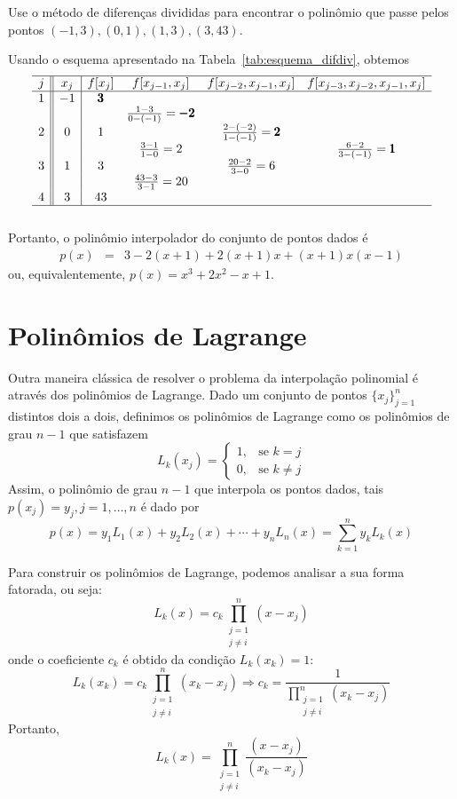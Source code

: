 \begin{ex}
Use o método de diferenças divididas para encontrar o polinômio que passe pelos pontos $(-1,3),(0,1),(1,3),(3,43)$.
\end{ex}
\begin{sol}
Usando o esquema apresentado na Tabela~\ref{tab:esquema_difdiv}, obtemos
\begin{equation*}
\begin{array}{c||c|cccc}\hline
 j&x_j&f[x_j]&f[x_{j-1},x_j]&f[x_{j-2},x_{j-1},x_j]&f[x_{j-3},x_{j-2},x_{j-1},x_j]\\\hline
1& -1 & \pmb{3}&&&\\
&&&\frac{1-3}{0-(-1)}=\pmb{-2}&&\\
2&0&1&&\frac{2-(-2)}{1-(-1)}=\pmb{2}&\\
&&&\frac{3-1}{1-0}=2&&\frac{6-2}{3-(-1)}=\pmb{1}\\
3&1&3&&\frac{20-2}{3-0}=6&\\
&&&\frac{43-3}{3-1}=20&&\\
4&3&43&&&\\\hline
\multicolumn{5}{c}{}
\end{array}  
\end{equation*}
Portanto, o polinômio interpolador do conjunto de pontos dados é
\begin{eqnarray*}
p(x)&=&3-2(x+1)+2(x+1)x+(x+1)x(x-1)
\end{eqnarray*}
ou, equivalentemente, $p(x) = x^3+2x^2-x+1$.
\end{sol}

\section{Polinômios de Lagrange}
Outra maneira clássica de resolver o problema da interpolação polinomial é através dos polinômios de Lagrange. Dado um conjunto de pontos $\{x_j\}_{j=1}^n$ distintos dois a dois, definimos os polinômios de Lagrange como os polinômios de grau $n-1$ que satisfazem
$$
L_k(x_j)=\left\{\begin{array}{rl}
1,& \text{se }k=j\\
0,& \text{se }k\neq j
\end{array}
\right.
$$
Assim, o polinômio de grau $n-1$ que interpola os pontos dados, tais $p(x_j)=y_j, j=1,\ldots,n$ é dado por
$$p(x)=y_1L_1(x)+y_2L_2(x)+\cdots +y_nL_n(x)=\sum_{k=1}^n y_k L_k(x)$$

Para construir os polinômios de Lagrange, podemos analisar a sua forma fatorada, ou seja:
$$L_k(x)=c_k\prod_{\substack{j=1\\j\ne i}}^{n} (x-x_j)$$
onde o coeficiente $c_k$ é obtido da condição $L_k(x_k)=1$:
$$L_k(x_k)=c_k\prod_{\substack{j=1\\j\ne i}}^{n} (x_k-x_j) \Longrightarrow  c_k=\frac{1}{\displaystyle \prod_{\substack{j=1\\j\ne i}}^{n} (x_k-x_j)}$$
Portanto,
$$L_k(x)=\prod_{\substack{j=1\\j\ne i}}^{n} \frac{(x-x_j)}{(x_k-x_j)}$$

